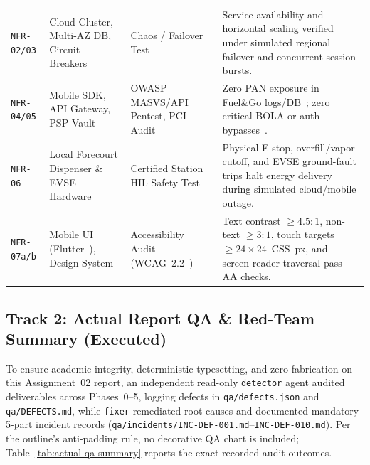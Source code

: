 \begin{table}[htbp]
{\begin{tabularx}{\linewidth}{@{}P{20mm} P{36mm} P{32mm} L@{}}
    \texttt{NFR-02/03} & Cloud Cluster, Multi-AZ DB, Circuit Breakers & Chaos / Failover Test & Service availability and horizontal scaling verified under simulated regional failover and concurrent session bursts. \\
    \texttt{NFR-04/05} & Mobile SDK, API Gateway, PSP Vault & OWASP MASVS/API Pentest, PCI Audit & Zero PAN exposure in Fuel\&Go logs/DB~\cite{pcissc2024pcidss401}; zero critical BOLA or auth bypasses~\cite{owasp2024masvs,owasp2023apitop10}. \\
    \texttt{NFR-06} & Local Forecourt Dispenser \& EVSE Hardware & Certified Station HIL Safety Test & Physical E-stop, overfill/vapor cutoff, and EVSE ground-fault trips halt energy delivery during simulated cloud/mobile outage. \\
    \texttt{NFR-07a/b} & Mobile UI (Flutter~\cite{flutter2025docs}), Design System & Accessibility Audit (WCAG~2.2~\cite{w3c2023wcag22}) & Text contrast $\ge 4.5{:}1$, non-text $\ge 3{:}1$, touch targets $\ge 24\times 24$~CSS~px, and screen-reader traversal pass AA checks. \\
    \bottomrule
  \end{tabularx}
  }
\end{table}

\subsection{Track 2: Actual Report QA \& Red-Team Summary (Executed)}
To ensure academic integrity, deterministic typesetting, and zero fabrication on this Assignment~02 report, an independent read-only \texttt{detector} agent audited deliverables across Phases~0--5, logging defects in \texttt{qa/defects.json} and \texttt{qa/DEFECTS.md}, while \texttt{fixer} remediated root causes and documented mandatory 5-part incident records (\texttt{qa/incidents/INC-DEF-001.md}--\texttt{INC-DEF-010.md}). Per the outline's anti-padding rule, no decorative QA chart is included; Table~\ref{tab:actual-qa-summary} reports the exact recorded audit outcomes.

